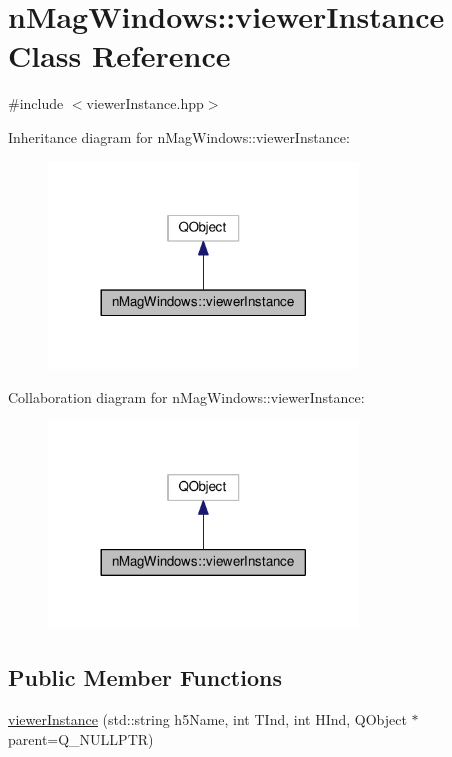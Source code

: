 \hypertarget{classnMagWindows_1_1viewerInstance}{}\section{n\+Mag\+Windows\+:\+:viewer\+Instance Class Reference}
\label{classnMagWindows_1_1viewerInstance}


{\ttfamily \#include $<$viewer\+Instance.\+hpp$>$}



Inheritance diagram for n\+Mag\+Windows\+:\+:viewer\+Instance\+:\nopagebreak
\begin{figure}[H]
\begin{center}
\leavevmode
\includegraphics[width=233pt]{d6/d37/classnMagWindows_1_1viewerInstance__inherit__graph}
\end{center}
\end{figure}


Collaboration diagram for n\+Mag\+Windows\+:\+:viewer\+Instance\+:\nopagebreak
\begin{figure}[H]
\begin{center}
\leavevmode
\includegraphics[width=233pt]{d1/d85/classnMagWindows_1_1viewerInstance__coll__graph}
\end{center}
\end{figure}
\subsection*{Public Member Functions}
\begin{DoxyCompactItemize}
\item 
\hyperlink{classnMagWindows_1_1viewerInstance_ad6cc22c4ff86766ab0cae5986164391b}{viewer\+Instance} (std\+::string h5\+Name, int T\+Ind, int H\+Ind, Q\+Object $\ast$parent=Q\+\_\+\+N\+U\+L\+L\+P\+TR)
\end{DoxyCompactItemize}


